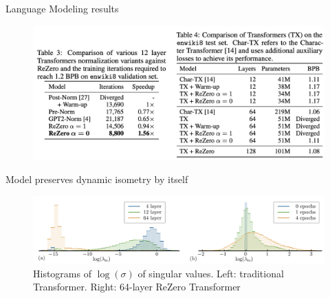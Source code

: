 \documentclass[handout, 10pt]{beamer}
\begin{document}
\begin{frame}{Language Modeling results}
\begin{figure}
\centering
\includegraphics[width=\textwidth]{images/lm-results}
\end{figure}
\end{frame}


\begin{frame}{Model preserves dynamic isometry by itself}
\begin{figure}
\centering
\includegraphics[width=\textwidth]{images/log-singular-values-hist}
\caption{Histograms of $\log(\sigma)$ of singular values. Left: traditional Transformer. Right: 64-layer ReZero Transformer}
\end{figure}
\end{frame}
\end{document}
